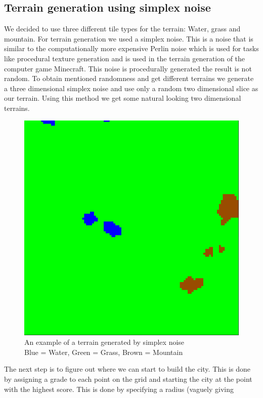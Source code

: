 \documentclass{scrartcl}
\begin{document}
\subsection{Terrain generation using simplex noise}
We decided to use three different tile types for the terrain: Water, grass and mountain.
For terrain generation we used a simplex noise. This is a noise that is similar
to the computationally more expensive Perlin noise which is used for tasks like
procedural texture generation and is used in the terrain generation of the computer
game Minecraft. This noise is procedurally generated the result is not random. To
obtain mentioned randomness and get different terrains we generate
a three dimensional simplex noise and use only a random two dimensional slice as our terrain.
Using this method we get some natural looking two dimensional terrains.
\begin{figure}
  \centering
  \includegraphics[scale = 0.2]{terrain_example}
  \caption{An example of a terrain generated by simplex noise \\Blue = Water, Green = Grass, Brown = Mountain}
\end{figure}
The next step is to figure out where we can start to build the city. This is done
by assigning a grade to each point on the grid and starting the city at the point
with the highest score. This is done by specifying a radius (vaguely giving
\end{document}
